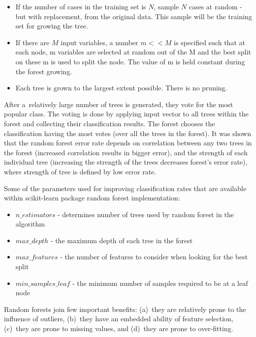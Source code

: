 \begin{itemize}
	
	\item If the number of cases in the training set is $N$, sample $N$ cases at random - but with replacement, from the original data. This sample will be the training set for growing the tree.
	\item If there are $M$ input variables, a number $m<<M$ is specified such that at each node, m variables are selected at random out of the M and the best split on these m is used to split the node. The value of m is held constant during the forest growing.
	\item Each tree is grown to the largest extent possible. There is no pruning.
	
\end{itemize}

After a~relatively large number of trees is generated, they vote for the most popular class. The voting is done by applying input vector to all trees within the forest and collecting their classification results. The forest chooses the classification having the most votes (over all the trees in the forest). It was shown that the random forest error rate depends on correlation between any two trees in the forest (increased correlation results in bigger error), and the strength of each individual tree (increasing the strength of the trees decreases forest's error rate), where strength of tree is defined by low error rate.

Some of the parameters used for improving classification rates that are available within scikit-learn package random forest implementation:

\begin{itemize}
	\item $n\_estimators$ - determines number of trees used by random forest in the algorithm
	\item $max\_depth$ - the maximum depth of each tree in the forest
	\item $max\_features$ - the number of features to consider when looking for the best split
	\item $min\_samples\_leaf$ - the minimum number of samples required to be at a leaf node
\end{itemize}

Random forests join few important benefits: (a)~they are relatively prone to the influence of outliers, (b)~they have an embedded ability of feature selection, (c)~they are prone to missing values, and (d)~they are prone to over-fitting.

